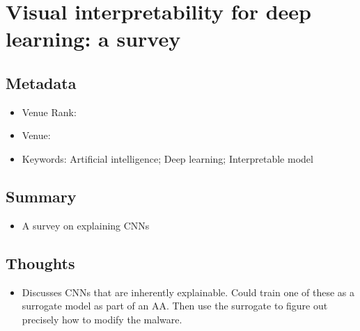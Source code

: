 \documentclass{article}
\begin{document}
\pagebreak


\section*{Visual interpretability for deep learning: a survey \cite{zhang2018visual}}

\subsection*{Metadata}
\begin{itemize}
	\item Venue Rank:
	\item Venue:
	\item Keywords: Artificial intelligence; Deep learning; Interpretable model
\end{itemize}

\subsection*{Summary}
\begin{itemize}
	\item A survey on explaining CNNs
\end{itemize}

\subsection*{Thoughts}
\begin{itemize}
	\item Discusses CNNs that are inherently explainable. Could train one of these as a surrogate model as part of an AA. Then use the surrogate to figure out precisely how to modify the malware.
\end{itemize}
\end{document}
